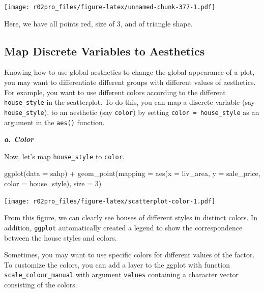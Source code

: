 \documentclass[
]{book}
\newenvironment{Shaded}{\begin{snugshade}}{\end{snugshade}}
\newcommand{\AttributeTok}[1]{\textcolor[rgb]{0.77,0.63,0.00}{#1}}
\newcommand{\DecValTok}[1]{\textcolor[rgb]{0.00,0.00,0.81}{#1}}
\newcommand{\FunctionTok}[1]{\textcolor[rgb]{0.00,0.00,0.00}{#1}}
\newcommand{\NormalTok}[1]{#1}
\newcommand{\SpecialCharTok}[1]{\textcolor[rgb]{0.00,0.00,0.00}{#1}}
\begin{document}
\texttt{[image: r02pro\_files/figure-latex/unnamed-chunk-377-1.pdf]}

Here, we have all points red, size of 3, and of triangle shape.

\hypertarget{map-discrete-aes}{%
\subsection{Map Discrete Variables to Aesthetics}\label{map-discrete-aes}}

Knowing how to use global aesthetics to change the global appearance of a plot, you may want to differentiate different groups with different values of aesthetics. For example, you want to use different colors according to the different \texttt{house\_style} in the scatterplot. To do this, you can map a discrete variable (say \texttt{house\_style}), to an aesthetic (say \texttt{color}) by setting \texttt{color\ =\ house\_style} as an argument in the \texttt{aes()} function.

\textbf{\emph{a. Color}}

Now, let's map \texttt{house\_style} to \texttt{color}.

\begin{Shaded}
\begin{Highlighting}[]
\FunctionTok{ggplot}\NormalTok{(}\AttributeTok{data =}\NormalTok{ sahp) }\SpecialCharTok{+} \FunctionTok{geom\_point}\NormalTok{(}\AttributeTok{mapping =} \FunctionTok{aes}\NormalTok{(}\AttributeTok{x =}\NormalTok{ liv\_area, }\AttributeTok{y =}\NormalTok{ sale\_price, }\AttributeTok{color =}\NormalTok{ house\_style), }\AttributeTok{size =} \DecValTok{3}\NormalTok{)}
\end{Highlighting}
\end{Shaded}

\texttt{[image: r02pro\_files/figure-latex/scatterplot-color-1.pdf]}

From this figure, we can clearly see houses of different styles in distinct colors. In addition, \texttt{ggplot} automatically created a legend to show the correspondence between the house styles and colors.

Sometimes, you may want to use specific colors for different values of the factor. To customize the colors, you can add a layer to the ggplot with function \texttt{scale\_colour\_manual} with argument \texttt{values} containing a character vector consisting of the colors.
\end{document}
